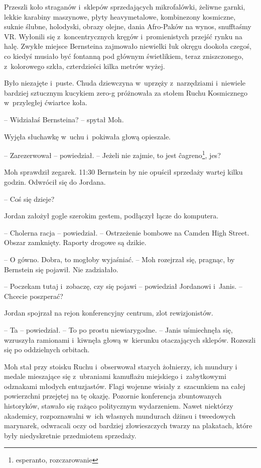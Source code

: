 \documentclass[oneside,polish,11pt,sfheadings]{mwbk}
\begin{document}
Przeszli koło straganów i~sklepów sprzedających mikrofalówki, żeliwne
garnki, lekkie karabiny maszynowe, płyty heavymetalowe, kombinezony
kosmiczne, suknie ślubne, holodyski, obrazy olejne, dania Afro-Paków na
wynos, snufftaśmy VR. Wyłonili się z~koncentrycznych kręgów i~promienistych przejść rynku na halę. Zwykłe miejsce Bernsteina zajmowało
niewielki łuk okręgu dookoła czegoś, co kiedyś musiało być fontanną pod
głównym świetlikiem, teraz zniszczonego, z~kolorowego szkła,
czterdzieści kilka metrów wyżej.

Było niezajęte i~puste. Chuda dziewczyna w~uprzęży z~narzędziami i~niewiele bardziej sztucznym kucykiem zero-g próżnowała za stołem Ruchu
Kosmicznego w~przyległej ćwiartce koła.

-- Widziałaś Bernsteina? -- spytał Moh.

Wyjęła słuchawkę w~uchu i~pokiwała głową opieszale. 

-- Zarezerwował -- powiedział. -- Jeżeli nie zajmie, to jest ĉagreno\footnote{esperanto, rozczarowanie}, jes?

Moh sprawdził zegarek. 11:30 Bernstein by nie opuścił sprzedaży wartej
kilku godzin. Odwrócił się do Jordana. 

-- Coś się dzieje?

Jordan założył gogle szerokim gestem, podłączył łącze do komputera. 

-- Cholerna racja -- powiedział. -- Ostrzeżenie bombowe na Camden High
Street. Obszar zamknięty. Raporty drogowe są dzikie.

-- O gówno. Dobra, to mogłoby wyjaśniać. -- Moh rozejrzał się, pragnąc, by
Bernstein się pojawił. Nie zadziałało.

-- Poczekam tutaj i~zobaczę, czy się pojawi -- powiedział Jordanowi i~Janis. -- Chcecie poszperać?

Jordan spojrzał na rejon konferencyjny centrum, zlot rewizjonistów. 

-- Ta
-- powiedział. -- To po prostu niewiarygodne. -- Janis uśmiechnęła się,
wzruszyła ramionami i~kiwnęła głową w~kierunku otaczających sklepów.
Rozeszli się po oddzielnych orbitach.

Moh stał przy stoisku Ruchu i~obserwował starych żołnierzy, ich mundury
i medale mieszające się z~ubraniami kamuflażu miejskiego i~zabytkowymi
odznakami młodych entuzjastów. Flagi wojenne wisiały z~szacunkiem na
całej powierzchni przejętej na tę okazję. Pozornie konferencja
zbuntowanych historyków, stawało się rażąco politycznym wydarzeniem.
Nawet niektórzy akademicy, rozpoznawalni w~ich własnych mundurach dżinsu
i tweedowych marynarek, odwracali oczy od bardziej złowieszczych twarzy
na plakatach, które były niedyskretnie przedmiotem sprzedaży.
\end{document}
